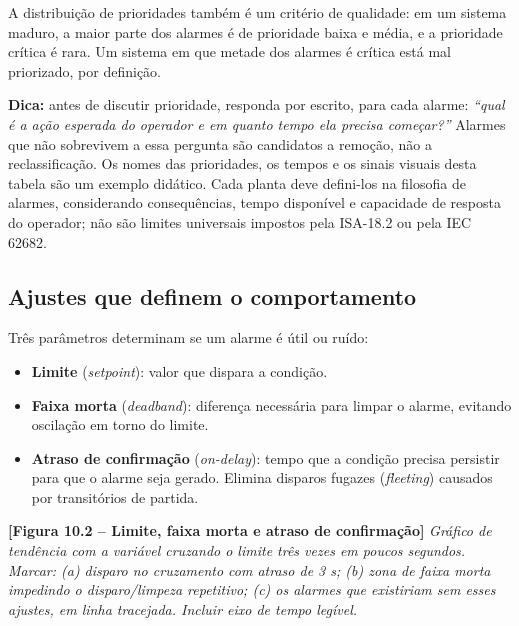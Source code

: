 A distribuição de prioridades também é um critério de qualidade: em um sistema maduro, a maior parte dos alarmes é de prioridade baixa e média, e a prioridade crítica é rara. Um sistema em que metade dos alarmes é crítica está mal priorizado, por definição.

\begin{caixadica}

\textbf{Dica:} antes de discutir prioridade, responda por escrito, para cada alarme: \emph{``qual é a ação esperada do operador e em quanto tempo ela precisa começar?''} Alarmes que não sobrevivem a essa pergunta são candidatos a remoção, não a reclassificação.
Os nomes das prioridades, os tempos e os sinais visuais desta tabela são um exemplo didático. Cada
planta deve defini-los na filosofia de alarmes, considerando consequências, tempo disponível e
capacidade de resposta do operador; não são limites universais impostos pela ISA-18.2 ou pela IEC
62682.

\end{caixadica}

\subsection{Ajustes que definem o comportamento}\label{ajustes-que-definem-o-comportamento}

Três parâmetros determinam se um alarme é útil ou ruído:

\begin{itemize}
\tightlist
\item
  \textbf{Limite} (\emph{setpoint}): valor que dispara a condição.
\item
  \textbf{Faixa morta} (\emph{deadband}): diferença necessária para limpar o alarme, evitando oscilação em torno do limite.
\item
  \textbf{Atraso de confirmação} (\emph{on-delay}): tempo que a condição precisa persistir para que o alarme seja gerado. Elimina disparos fugazes (\emph{fleeting}) causados por transitórios de partida.
\end{itemize}

\begin{caixafigura}

\textbf{{[}Figura 10.2 -- Limite, faixa morta e atraso de confirmação{]}}
\emph{Gráfico de tendência com a variável cruzando o limite três vezes em poucos segundos. Marcar: (a) disparo no cruzamento com atraso de 3 s; (b) zona de faixa morta impedindo o disparo/limpeza repetitivo; (c) os alarmes que existiriam sem esses ajustes, em linha tracejada. Incluir eixo de tempo legível.}

\end{caixafigura}

